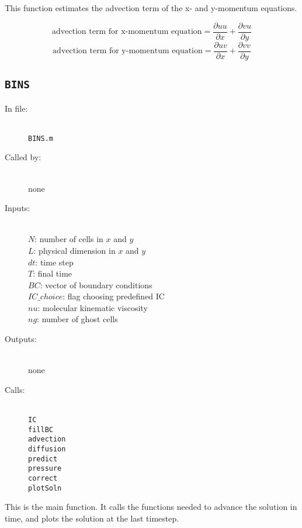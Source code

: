 \documentclass[12pt]{article}
\begin{document}
This function  estimates the advection term of the x- and y-momentum equations.

\[ \text{advection term for x-momentum equation} = \frac{\partial uu}{\partial x} + \frac{\partial vu}{\partial y} \]
\[ \text{advection term for y-momentum equation} = \frac{\partial uv}{\partial x} + \frac{\partial vv}{\partial y} \]


\subsection{\texttt{BINS}}
\begin{description}
\item[In file:] \hfill \\ \texttt{BINS.m}
\item[Called by:] \hfill \\ none
\item[Inputs:] \hfill \\ $N$: number of cells in $x$ and $y$ \\ $L$: physical dimension in $x$ and $y$ \\ $dt$: time step \\ $T$: final time \\ $BC$: vector of boundary conditions \\ $IC\_choice$: flag choosing predefined IC \\ $nu$: molecular kinematic viscosity \\ $ng$: number of ghost cells
\item[Outputs:] \hfill \\ none
\item[Calls:] \hfill \\ \texttt{IC} \\ \texttt{fillBC} \\ \texttt{advection} \\ \texttt{diffusion} \\ \texttt{predict} \\ \texttt{pressure} \\ \texttt{correct} \\ \texttt{plotSoln}
\end{description}
This is the main function.  It calls the functions needed to advance the solution in time, and plots the solution at the last timestep.
\end{document}
